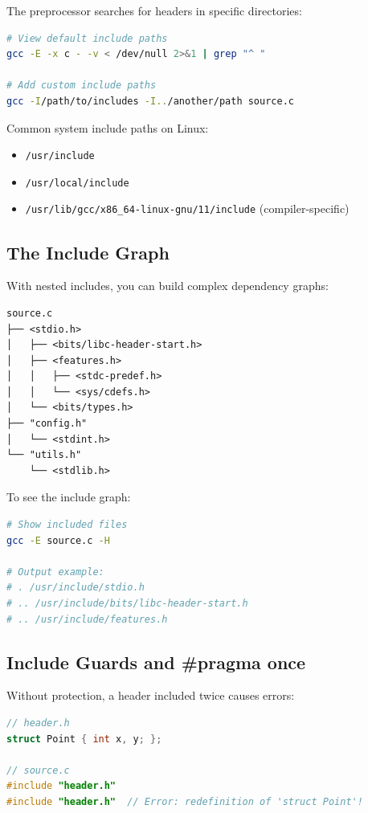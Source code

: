 The preprocessor searches for headers in specific directories:

\begin{lstlisting}[language=bash]
# View default include paths
gcc -E -x c - -v < /dev/null 2>&1 | grep "^ "

# Add custom include paths
gcc -I/path/to/includes -I../another/path source.c
\end{lstlisting}

Common system include paths on Linux:
\begin{itemize}
    \item \texttt{/usr/include}
    \item \texttt{/usr/local/include}
    \item \texttt{/usr/lib/gcc/x86\_64-linux-gnu/11/include} (compiler-specific)
\end{itemize}

\subsection{The Include Graph}

With nested includes, you can build complex dependency graphs:

\begin{verbatim}
source.c
├── <stdio.h>
│   ├── <bits/libc-header-start.h>
│   ├── <features.h>
│   │   ├── <stdc-predef.h>
│   │   └── <sys/cdefs.h>
│   └── <bits/types.h>
├── "config.h"
│   └── <stdint.h>
└── "utils.h"
    └── <stdlib.h>
\end{verbatim}

To see the include graph:

\begin{lstlisting}[language=bash]
# Show included files
gcc -E source.c -H

# Output example:
# . /usr/include/stdio.h
# .. /usr/include/bits/libc-header-start.h
# .. /usr/include/features.h
\end{lstlisting}

\subsection{Include Guards and \#pragma once}

Without protection, a header included twice causes errors:

\begin{lstlisting}[language=C]
// header.h
struct Point { int x, y; };

// source.c
#include "header.h"
#include "header.h"  // Error: redefinition of 'struct Point'!
\end{lstlisting}

